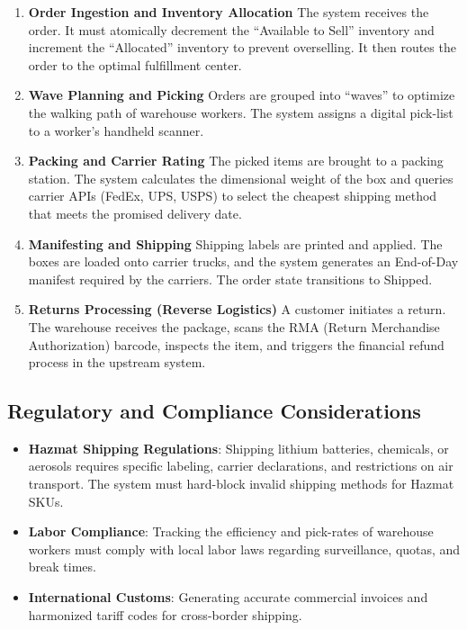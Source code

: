 \documentclass[
  11pt,
  openany,
  oneside]{book}
\providecommand{\tightlist}{%
  \setlength{\itemsep}{0pt}\setlength{\parskip}{0pt}}
\begin{document}
\begin{enumerate}
\def\labelenumi{\arabic{enumi}.}
\item
  \textbf{Order Ingestion and Inventory Allocation} The system receives
  the order. It must atomically decrement the ``Available to Sell''
  inventory and increment the ``Allocated'' inventory to prevent
  overselling. It then routes the order to the optimal fulfillment
  center.
\item
  \textbf{Wave Planning and Picking} Orders are grouped into ``waves''
  to optimize the walking path of warehouse workers. The system assigns
  a digital pick-list to a worker's handheld scanner.
\item
  \textbf{Packing and Carrier Rating} The picked items are brought to a
  packing station. The system calculates the dimensional weight of the
  box and queries carrier APIs (FedEx, UPS, USPS) to select the cheapest
  shipping method that meets the promised delivery date.
\item
  \textbf{Manifesting and Shipping} Shipping labels are printed and
  applied. The boxes are loaded onto carrier trucks, and the system
  generates an End-of-Day manifest required by the carriers. The order
  state transitions to Shipped.
\item
  \textbf{Returns Processing (Reverse Logistics)} A customer initiates a
  return. The warehouse receives the package, scans the RMA (Return
  Merchandise Authorization) barcode, inspects the item, and triggers
  the financial refund process in the upstream system.
\end{enumerate}

\subsection{Regulatory and Compliance
Considerations}\label{regulatory-and-compliance-considerations-2}

\begin{itemize}
\tightlist
\item
  \textbf{Hazmat Shipping Regulations}: Shipping lithium batteries,
  chemicals, or aerosols requires specific labeling, carrier
  declarations, and restrictions on air transport. The system must
  hard-block invalid shipping methods for Hazmat SKUs.
\item
  \textbf{Labor Compliance}: Tracking the efficiency and pick-rates of
  warehouse workers must comply with local labor laws regarding
  surveillance, quotas, and break times.
\item
  \textbf{International Customs}: Generating accurate commercial
  invoices and harmonized tariff codes for cross-border shipping.
\end{itemize}
\end{document}
